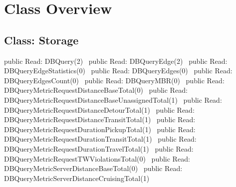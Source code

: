\chapter*{Class Overview}
\label{overview}


\section*{Class: Storage}
\nwenddocs{}\endmoddef{}
public \LA{}Read: DBQuery(2)~{\nwtagstyle{}}\RA{}
public \LA{}Read: DBQueryEdge(2)~{\nwtagstyle{}}\RA{}
public \LA{}Read: DBQueryEdgeStatistics(0)~{\nwtagstyle{}}\RA{}
public \LA{}Read: DBQueryEdges(0)~{\nwtagstyle{}}\RA{}
public \LA{}Read: DBQueryEdgesCount(0)~{\nwtagstyle{}}\RA{}
public \LA{}Read: DBQueryMBR(0)~{\nwtagstyle{}}\RA{}
public \LA{}Read: DBQueryMetricRequestDistanceBaseTotal(0)~{\nwtagstyle{}}\RA{}
public \LA{}Read: DBQueryMetricRequestDistanceBaseUnassignedTotal(1)~{\nwtagstyle{}}\RA{}
public \LA{}Read: DBQueryMetricRequestDistanceDetourTotal(1)~{\nwtagstyle{}}\RA{}
public \LA{}Read: DBQueryMetricRequestDistanceTransitTotal(1)~{\nwtagstyle{}}\RA{}
public \LA{}Read: DBQueryMetricRequestDurationPickupTotal(1)~{\nwtagstyle{}}\RA{}
public \LA{}Read: DBQueryMetricRequestDurationTransitTotal(1)~{\nwtagstyle{}}\RA{}
public \LA{}Read: DBQueryMetricRequestDurationTravelTotal(1)~{\nwtagstyle{}}\RA{}
public \LA{}Read: DBQueryMetricRequestTWViolationsTotal(0)~{\nwtagstyle{}}\RA{}
public \LA{}Read: DBQueryMetricServerDistanceBaseTotal(0)~{\nwtagstyle{}}\RA{}
public \LA{}Read: DBQueryMetricServerDistanceCruisingTotal(1)~{\nwtagstyle{}}\RA{}
